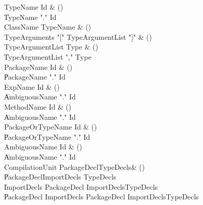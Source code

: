 \begin{bbgrammar}
 TypeName  \label{prod:TypeName}  \: Id & ()\\
    \| TypeName \xcd"." Id\\
 ClassName  \label{prod:ClassName}  \: TypeName & ()\\
 TypeArguments  \label{prod:TypeArguments}  \: \xcd"[" TypeArgumentList \xcd"]" & ()\\
 TypeArgumentList  \label{prod:TypeArgumentList}  \: Type & ()\\
    \| TypeArgumentList \xcd"," Type\\
 PackageName  \label{prod:PackageName}  \: Id & ()\\
    \| PackageName \xcd"." Id\\
 ExpName  \label{prod:ExpName}  \: Id & ()\\
    \| AmbiguousName \xcd"." Id\\
 MethodName  \label{prod:MethodName}  \: Id & ()\\
    \| AmbiguousName \xcd"." Id\\
 PackageOrTypeName  \label{prod:PackageOrTypeName}  \: Id & ()\\
    \| PackageOrTypeName \xcd"." Id\\
 AmbiguousName  \label{prod:AmbiguousName}  \: Id & ()\\
    \| AmbiguousName \xcd"." Id\\
 CompilationUnit  \label{prod:CompilationUnit}  \: PackageDecl\opt TypeDecls\opt & ()\\
    \| PackageDecl\opt ImportDecls TypeDecls\opt\\
    \| ImportDecls PackageDecl  ImportDecls\opt  TypeDecls\opt\\
    \| PackageDecl ImportDecls PackageDecl  ImportDecls\opt  TypeDecls\opt\\
\end{bbgrammar}

